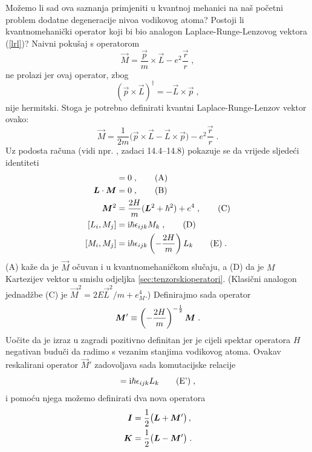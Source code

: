 Možemo li sad ova saznanja primjeniti u kvantnoj mehanici na naš
početni problem dodatne degeneracije nivoa vodikovog atoma?
Postoji li kvantnomehanički operator koji bi bio analogon 
Laplace-Runge-Lenzovog vektora (\ref{lrl})? Naivni pokušaj
s operatorom
\begin{equation}
  \vec{M} = \frac{\vec{p}}{m}\times\vec{L} - e^2\frac{\vec{r}}{r} \;,
\end{equation}
ne prolazi jer ovaj operator, zbog 
\begin{displaymath}
    (\vec{p}\times\vec{L})^\dagger = - \vec{L}\times\vec{p} \;,
\end{displaymath}
nije hermitski. Stoga je potrebno definirati kvantni
Laplace-Runge-Lenzov vektor ovako:
\begin{equation}
  \vec{M} = \frac{1}{2m}\big(\vec{p}\times\vec{L}- \vec{L}\times\vec{p}\big) 
- e^2\frac{\vec{r}}{r} \;.
\end{equation}
Uz podosta računa (vidi npr. \cite{Greiner:1989}, zadaci 14.4--14.8) 
pokazuje se da vrijede sljedeći identiteti
\begin{align}
 [\vec{M}, H] &= 0 \;, \tag{A} \\
 \vec{L}\cdot\vec{M} &= 0 \;, \tag{B} \\
\vec{M}^2 &= \frac{2 H}{m}(\vec{L}^2 + \hbar^2) + e^4  \;, \tag{C} \\
 [L_i, M_j] &= \rmi\hbar \epsilon_{ijk} M_k \;, \tag{D} \\
[M_i, M_j] &= \rmi \hbar \epsilon_{ijk} \left(- \frac{2H}{m}\right) L_k \tag{E} \;.
\end{align}
(A) kaže da je $\vec{M}$ očuvan i u kvantnomehaničkom slučaju, a (D) da
je $M$ Kartezijev vektor u smislu odjeljka \ref{sec:tenzorskioperatori}.
(Klasični analogon jednadžbe (C) je $\vec{M}^2 = 2E\vec{L}^2/m + e_{M}^4$.)
Definirajmo sada operator 
\begin{equation}
\vec{M}' \equiv \left(- \frac{2H}{m}\right)^{-\fhalf} \vec{M} \;.
\end{equation}
Uočite da je izraz u zagradi pozitivno definitan jer je cijeli spektar operatora $H$
negativan buduči da radimo s vezanim stanjima vodikovog atoma.
Ovakav reskalirani operator $\vec{M}'$ zadovoljava sada komutacijske
relacije
\begin{equation}
[M'_i, M'_j] = \rmi \hbar \epsilon_{ijk}  L_k \tag{E'} \;,
\end{equation}
i pomoću njega možemo definirati dva nova operatora
\begin{align}
\vec{I} &= \fhalf \big(\vec{L} + \vec{M}'\big) \,, \\
\vec{K} &= \fhalf \big(\vec{L} - \vec{M}'\big) \;.
\end{align}
